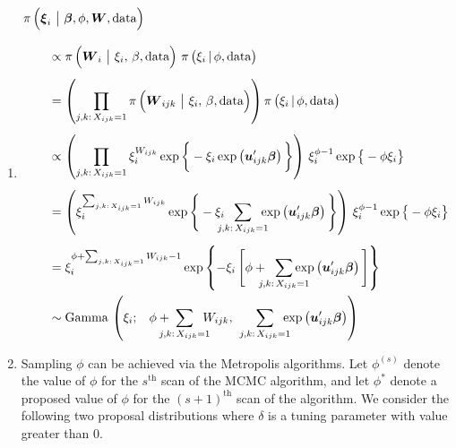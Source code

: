 \documentclass[11pt]{article}
\renewcommand{\vec}{\boldsymbol}
\newcommand{\barS}{\,|\,}
\newcommand{\barM}{~\big|~}
\begin{document}
\begin{enumerate}[label=Step \arabic*., leftmargin=13mm, itemsep=10mm]

\item 
\begin{align*} \MoveEqLeft
\pi\, \Big( \vec{\xi}_i \barM \vec{\beta}, \phi, \vec{W}, \text{data} \Big) \\[2ex]
&\propto \pi\,\Big( \vec{W}_i \barM \xi_i,\, \beta, \text{data} \Big)~ \pi\, \big( \xi_i \barS \phi, \text{data} \big) \\[1ex]
&= \left( \prod_{j,k{:}\, X_{ijk}=1} \pi\,\Big( \vec{W}_{ijk} \barM \xi_i,\, \beta, \text{data} \Big) \right) \pi\, \big( \xi_i \barS \phi, \text{data} \big) \\[1ex]
&\propto \left( \prod_{j,k{:}\, X_{ijk}=1} \xi_i^{W_{ijk}} \exp\bigg\{ -\xi_i \exp\left( \vec{u}_{ijk}^\prime \vec{\beta} \right) \bigg\} \right)\, \xi_i^{\phi - 1} \exp\big\{ -\phi \xi_i \big\} \\[1ex]
&= \left( \xi_i^{\sum_{j,k{:}\, X_{ijk}=1} W_{ijk}} \exp\Bigg\{ -\xi_i \hspace{2mm} \sum_{\mathclap{ j,k{:}\, X_{ijk}=1 }} \hspace{2mm} \exp\left( \vec{u}_{ijk}^\prime \vec{\beta} \right) \Bigg\} \right)\, \xi_i^{\phi - 1} \exp\big\{ -\phi \xi_i \big\} \\[1ex]
&= \xi_i^{ \phi + \sum_{j,k{:}\, X_{ijk}=1} W_{ijk} - 1 } \exp\left\{ -\xi_i\, \Bigg[ \phi + \hspace{2mm} \sum_{\mathclap{ j,k{:}\, X_{ijk}=1 }} \exp\left( \vec{u}_{ijk}^\prime \vec{\beta} \right) \Bigg] \right\} \\
& \sim \text{Gamma}\,\left(\xi_i; \hspace{3mm} \phi + \hspace{1mm} \sum_{\mathclap{ j,k{:}\, X_{ijk}=1 }} \hspace{2mm} W_{ijk}, \hspace{6mm} \sum_{\mathclap{ j,k{:}\, X_{ijk}=1 }}\hspace{2mm} \exp\left( \vec{u}_{ijk}^\prime \vec{\beta} \right) \right)
\end{align*}






\item Sampling $\phi$ can be achieved via the Metropolis algorithms.  Let $\phi^{(s)}$ denote the value of $\phi$ for the $s^{\text{th}}$ scan of the MCMC algorithm, and let $\phi^*$ denote a proposed value of $\phi$ for the $(s+1)^{\text{th}}$ scan of the algorithm.  We consider the following two proposal distributions where $\delta$ is a tuning parameter with value greater than 0. \vspace{2mm}


\end{enumerate}
\end{document}
